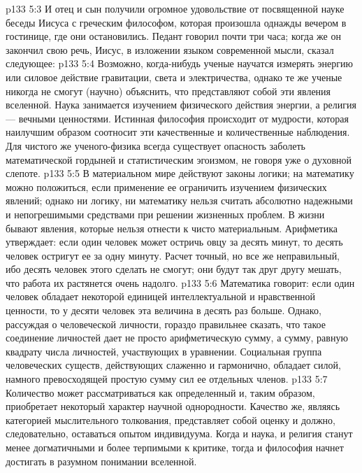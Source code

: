 \vs p133 5:3 И отец и сын получили огромное удовольствие от посвященной науке беседы Иисуса с греческим философом, которая произошла однажды вечером в гостинице, где они остановились. Педант говорил почти три часа; когда же он закончил свою речь, Иисус, в изложении языком современной мысли, сказал следующее:
\vs p133 5:4 \pc Возможно, когда\hyp{}нибудь ученые научатся измерять энергию или силовое действие гравитации, света и электричества, однако те же ученые никогда не смогут (научно) объяснить, что представляют собой эти явления вселенной. Наука занимается изучением физического действия энергии, а религия --- вечными ценностями. Истинная философия происходит от мудрости, которая наилучшим образом соотносит эти качественные и количественные наблюдения. Для чистого же ученого\hyp{}физика всегда существует опасность заболеть математической гордыней и статистическим эгоизмом, не говоря уже о духовной слепоте.
\vs p133 5:5 В материальном мире действуют законы логики; на математику можно положиться, если применение ее ограничить изучением физических явлений; однако ни логику, ни математику нельзя считать абсолютно надежными и непогрешимыми средствами при решении жизненных проблем. В жизни бывают явления, которые нельзя отнести к чисто материальным. Арифметика утверждает: если один человек может остричь овцу за десять минут, то десять человек остригут ее за одну минуту. Расчет точный, но все же неправильный, ибо десять человек этого сделать не смогут; они будут так друг другу мешать, что работа их растянется очень надолго.
\vs p133 5:6 Математика говорит: если один человек обладает некоторой единицей интеллектуальной и нравственной ценности, то у десяти человек эта величина в десять раз больше. Однако, рассуждая о человеческой личности, гораздо правильнее сказать, что такое соединение личностей дает не просто арифметическую сумму, а сумму, равную квадрату числа личностей, участвующих в уравнении. Социальная группа человеческих существ, действующих слаженно и гармонично, обладает силой, намного превосходящей простую сумму сил ее отдельных членов.
\vs p133 5:7 Количество может рассматриваться как определенный  и, таким образом, приобретает некоторый характер научной однородности. Качество же, являясь категорией мыслительного толкования, представляет собой оценку  и должно, следовательно, оставаться опытом индивидуума. Когда и наука, и религия станут менее догматичными и более терпимыми к критике, тогда и философия начнет достигать  в разумном понимании вселенной.
